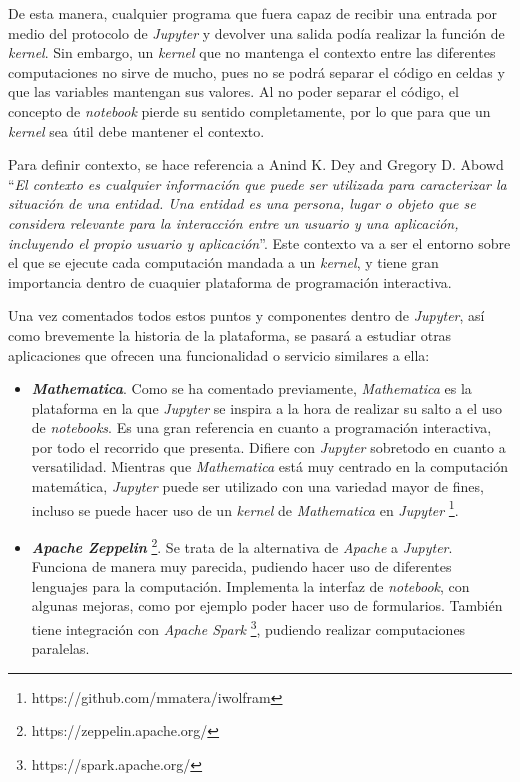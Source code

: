 \documentclass[11pt,spanish,listoffigures]{tfgetsinf}
\begin{document}
De esta manera, cualquier programa que fuera capaz de recibir una entrada por medio del protocolo de \textit{Jupyter} y devolver una salida podía realizar la función de \textit{kernel}. Sin embargo, un \textit{kernel} que no mantenga el contexto entre las diferentes computaciones no sirve de mucho, pues no se podrá separar el código en celdas y que las variables mantengan sus valores. Al no poder separar el código, el concepto de \textit{notebook} pierde su sentido completamente, por lo que para que un \textit{kernel} sea útil debe mantener el contexto.

Para definir contexto, se hace referencia a Anind K. Dey and Gregory D. Abowd \cite{context} ``\textit{El contexto es cualquier información que puede ser utilizada para caracterizar la situación de una entidad. Una entidad es una persona, lugar o objeto que se considera relevante para la interacción entre un usuario y una aplicación, incluyendo el propio usuario y aplicación}''. Este contexto va a ser el entorno sobre el que se ejecute cada computación mandada a un \textit{kernel}, y tiene gran importancia dentro de cuaquier plataforma de programación interactiva.

Una vez comentados todos estos puntos y componentes dentro de \textit{Jupyter}, así como brevemente la historia de la plataforma, se pasará a estudiar otras aplicaciones que ofrecen una funcionalidad o servicio similares a ella:

\begin{itemize}

\item \textbf{\textit{Mathematica}}. Como se ha comentado previamente, \textit{Mathematica} es la plataforma en la que \textit{Jupyter} se inspira a la hora de realizar su salto a el uso de \textit{notebooks}. Es una gran referencia en cuanto a programación interactiva, por todo el recorrido que presenta. Difiere con \textit{Jupyter} sobretodo en cuanto a versatilidad. Mientras que \textit{Mathematica} está muy centrado en la computación matemática, \textit{Jupyter} puede ser utilizado con una variedad mayor de fines, incluso se puede hacer uso de un \textit{kernel} de \textit{Mathematica} en \textit{Jupyter} \footnote{https://github.com/mmatera/iwolfram}.

\item \textbf{\textit{Apache Zeppelin}} \footnote{https://zeppelin.apache.org/}. Se trata de la alternativa de \textit{Apache} a \textit{Jupyter}. Funciona de manera muy parecida, pudiendo hacer uso de diferentes lenguajes para la computación. Implementa la interfaz de \textit{notebook}, con algunas mejoras, como por ejemplo poder hacer uso de formularios. También tiene integración con \textit{Apache Spark} \footnote{https://spark.apache.org/}, pudiendo realizar computaciones paralelas.

\end{itemize}
\end{document}
